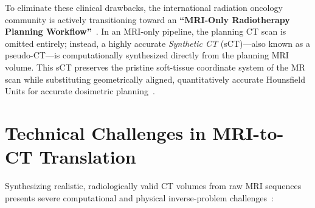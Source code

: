 To eliminate these clinical drawbacks, the international radiation oncology community is actively transitioning toward an \textbf{``MRI-Only Radiotherapy Planning Workflow''}~\cite{edmund2017review,thummerer2023synthrad2023}. In an MRI-only pipeline, the planning CT scan is omitted entirely; instead, a highly accurate \emph{Synthetic CT} (sCT)—also known as a pseudo-CT—is computationally synthesized directly from the planning MRI volume. This sCT preserves the pristine soft-tissue coordinate system of the MR scan while substituting geometrically aligned, quantitatively accurate Hounsfield Units for accurate dosimetric planning~\cite{thummerer2023synthrad2023}.

\section{Technical Challenges in MRI-to-CT Translation}
Synthesizing realistic, radiologically valid CT volumes from raw MRI sequences presents severe computational and physical inverse-problem challenges~\cite{edmund2017review,kazerouni2023diffusion,lyu2022conversion}:
